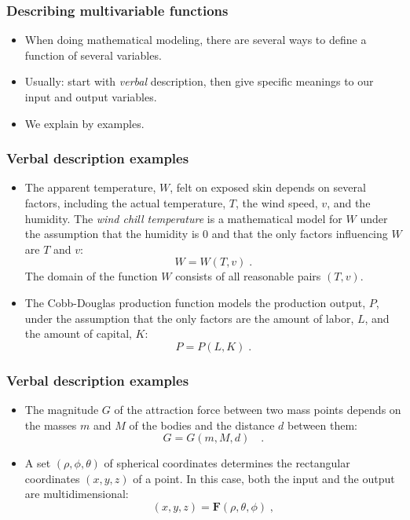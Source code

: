 \begin{frame}\frametitle{Describing multivariable functions}
\begin{itemize}
\item When doing mathematical modeling, there are several ways to define a function of several variables.
\item<2-> Usually: start with \emph{verbal} description, then give specific meanings
to our input and output variables.
\item<3-> We explain by examples.
\end{itemize}
\end{frame}

\begin{frame}\frametitle{Verbal description examples}
\begin{itemize}
\item The apparent temperature, $W$, felt on exposed skin depends on several factors, including the actual temperature, $T$, the wind speed, $v$, and the humidity.  The \emph{wind chill temperature} is a mathematical model  for $W$ under the assumption that the humidity is 0 and  that the only factors influencing $W$ are $T$ and $v$:
\[
W = W(T,v)\; .
\]
The domain of the function $W$ consists of all reasonable pairs $(T,v)$.
\item<2-> The Cobb-Douglas production function models the production output, $P$, under the assumption that the only factors are the amount of labor, $L$, and the amount of capital, $K$:
\[
P=P(L,K) \; .
\]
\end{itemize}

\vskip 8cm %
\end{frame}
\begin{frame}\frametitle{Verbal description examples}
\begin{itemize}
\item The magnitude $G$ of the attraction force between two mass points depends on the masses $m$ and $M$ of the bodies and the distance $d$ between them:
\[
G=G(m,M,d) \quad .
\]
\item<2-> A set $(\rho, \phi, \theta)$ of spherical coordinates determines the rectangular coordinates $(x,y,z)$ of a point. In this case, both the input and the output are multidimensional:
\[
(x,y,z) = \textbf{F}(\rho, \theta, \phi)\; ,
\]

\end{itemize}

\vskip 8cm %

\end{frame}
